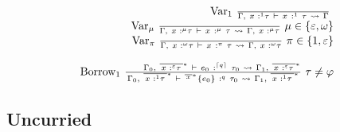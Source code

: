 \[\begin{array}{r}
{\text{Var}_{1}\ \frac{\text{\quad\quad}\ }{\Gamma{,\ }{x\text{ :}^{1}\tau}\  \vdash \ x\ :^{1}\ \tau\  \rightsquigarrow \ \Gamma}\ } \\
{\text{Var}_{\mu}\ \frac{\text{\quad\quad}\ }{\Gamma{,\ }{x\text{ :}^{\mu}\tau}\  \vdash \ x\ :^{\mu}\ \tau\  \rightsquigarrow \ \Gamma{,\ }{x\text{ :}^{\mu}\tau}}\ \mu \in \left\{ \varepsilon,\omega \right\}} \\
{\text{Var}_{\pi}\ \frac{\text{\quad\quad}\ }{\Gamma{,\ }{x\text{ :}^{\omega}\tau}\  \vdash \ x\ :^{\pi}\ \tau\  \rightsquigarrow \ \Gamma{,\ }{x\text{ :}^{\omega}\tau}}\ \pi \in \left\{ 1,\varepsilon \right\}} \\
 \\
{\text{Borrow}_{1}\ \frac{\text{\quad\quad}{\Gamma_{0}{,\ }{\overline{\,{x\text{ :}^{\varepsilon}\tau}\:}}^{\ast}\  \vdash \ e_{0}\ :^{\left\lceil q \right\rceil}\ \tau_{0}\  \rightsquigarrow \ \Gamma_{1}{,\ }{\overline{\,{x\text{ :}^{\varepsilon}\tau}\:}}^{\ast}}}{\Gamma_{0}{,\ }{\overline{\,{x\text{ :}^{1}\tau}\:}}^{\ast}\  \vdash \ {{}^{{\overline{\, x\:}}^{\ast}}\left\{ e_{0} \right\}}\ :^{q}\ \tau_{0}\  \rightsquigarrow \ \Gamma_{1}{,\ }{\overline{\,{x\text{ :}^{1}\tau}\:}}^{\ast}}\ \tau \neq \varphi}
\end{array}\]

\subsection{Uncurried}

